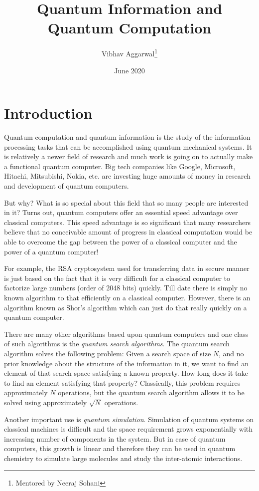 \documentclass[12pts, letterpaper]{article}
\title{Quantum Information and Quantum Computation}
\author{Vibhav Aggarwal\thanks{Mentored by Neeraj Sohani}}
\date{June 2020}
\numberwithin{equation}{section}
\theoremstyle{definition}
\numberwithin{definition}{section}
\numberwithin{theorem}{section}
\theoremstyle{remark}
\numberwithin{exercise}{section}
\begin{document}
\maketitle

\tableofcontents
\newpage
\section{Introduction}

Quantum computation and quantum information is the study of the information processing tasks that can be accomplished using quantum mechanical systems. It is relatively a newer field of research and much work is going on to actually make a functional quantum computer. Big tech companies like Google, Microsoft, Hitachi, Mitsubishi, Nokia, etc. are investing huge amounts of money in research and development of quantum computers.
\vspace{1em}

But why? What is so special about this field that so many people are interested in it? Turns out, quantum computers offer an essential speed advantage over classical computers. This speed advantage is so significant that many researchers believe that no conceivable amount of progress in classical computation would be able to overcome the gap between the power of a classical computer and the power of a quantum computer!
\vspace{1em}

For example, the RSA cryptosystem used for transferring data in secure manner is just based on the fact that it is very difficult for a classical computer to factorize large numbers (order of 2048 bits) quickly. Till date there is simply no known algorithm to that efficiently on a classical computer. However, there is an algorithm known as Shor’s algorithm which can just do that really quickly on a quantum computer.
\vspace{1em}

There are many other algorithms based upon quantum computers and one class of such algorithms is the \textit{quantum search algorithms}. The quantum search algorithm solves
the following problem: Given a search space of size $N$, and no prior knowledge about the
structure of the information in it, we want to find an element of that search space satisfying a known property. How long does it take to find an element satisfying that property?
Classically, this problem requires approximately $N$ operations, but the quantum search algorithm allows it to be solved using approximately $\sqrt{N}$ operations.
\vspace{1em}

Another important use is \textit{quantum simulation}. Simulation of quantum systems on classical machines is difficult and the space requirement grows exponentially with increasing number of components in the system. But in case of quantum computers, this growth is linear and therefore they can be used in quantum chemistry to simulate large molecules and study the inter-atomic interactions.

\newpage

\newpage

\newpage

\newpage

\newpage

\newpage

% 
\end{document}
